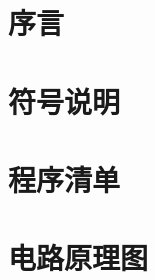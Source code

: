 \documentclass[draft]{XaufeThesisTemplate}
\begin{document}





\listoftodos


% 

\setcounter{tocdepth}{3}
\tableofcontents
\newpage

\setcounter{page}{1}

\ifdraft{
	
}{}
\section{序言}
	
\section{符号说明}
	

\ifdraft{
	
}{}

	\pagebreak

\nocite{*}

\pagebreak
\begin{appendices} %
	\ifdraft{
		
	}{}
  \section{程序清单}
  \section{电路原理图}
\end{appendices}

\pagebreak
\thanksSection
	
\end{document}
